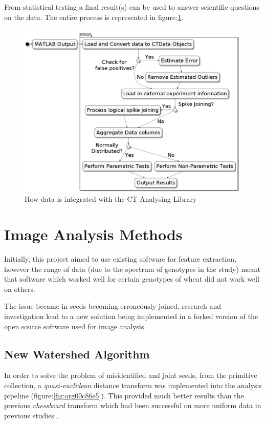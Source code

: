 \documentclass[11pt]{report}
\begin{document}
From statistical testing a final result(s) can be used to answer scientific questions on the data. The entire process is represented in figure:\ref{fig:orgbb38b02}.
\clearpage
\begin{figure}[htbp]
\centering
\includegraphics[width=18cm]{./images/pipeline.png}
\caption{\label{fig:orgbb38b02}
How data is integrated with the CT Analysing Library}
\end{figure}

\section{Image Analysis Methods}
\label{sec:org1cad466}
Initially, this project aimed to use existing software for feature extraction, however the range of data (due to the spectrum of genotypes in the study) meant that software which worked well for certain genotypes of wheat did not work well on others.

The issue became in seeds becoming erroneously joined, research and investigation lead to a new solution being implemented in a forked version of the open source software used for image analysis \cite{Hughes2017}

\subsection{New Watershed Algorithm}
\label{sec:orgba46190}

In order to solve the problem of misidentified and joint seeds, from the primitive collection,
a  \emph{quasi-euclidean} distance transform was implemented into the analysis pipeline (figure:\ref{fig:org00c86e5}). This provided much better results than the previous
\emph{chessboard} transform which had been successful on more uniform data in previous studies \cite{Hughes2017}.
\end{document}
